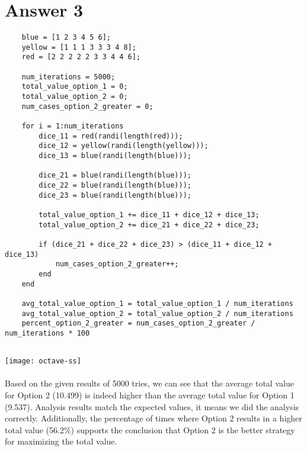 \documentclass[12pt]{article}
\begin{document}
\section*{Answer 3}

\begin{verbatim}
    blue = [1 2 3 4 5 6];
    yellow = [1 1 1 3 3 3 4 8];
    red = [2 2 2 2 2 3 3 4 4 6];
    
    num_iterations = 5000;
    total_value_option_1 = 0;
    total_value_option_2 = 0;
    num_cases_option_2_greater = 0;
    
    for i = 1:num_iterations
        dice_11 = red(randi(length(red)));
        dice_12 = yellow(randi(length(yellow)));
        dice_13 = blue(randi(length(blue)));
        
        dice_21 = blue(randi(length(blue)));
        dice_22 = blue(randi(length(blue)));
        dice_23 = blue(randi(length(blue)));
    
        total_value_option_1 += dice_11 + dice_12 + dice_13;
        total_value_option_2 += dice_21 + dice_22 + dice_23;
    
        if (dice_21 + dice_22 + dice_23) > (dice_11 + dice_12 + dice_13)
            num_cases_option_2_greater++;
        end
    end
    
    avg_total_value_option_1 = total_value_option_1 / num_iterations
    avg_total_value_option_2 = total_value_option_2 / num_iterations
    percent_option_2_greater = num_cases_option_2_greater / num_iterations * 100
    
\end{verbatim} 
\texttt{[image: octave-ss]} \\ \\

Based on the given results of 5000 tries, we can see that the average total value for Option 2 (10.499) is indeed higher than the average total value for Option 1 (9.537). Analysis results match the expected values, it means we did the analysis correctly. Additionally, the percentage of times where Option 2 results in a higher total value (56.2\%) supports the conclusion that Option 2 is the better strategy for maximizing the total value.
\end{document}

